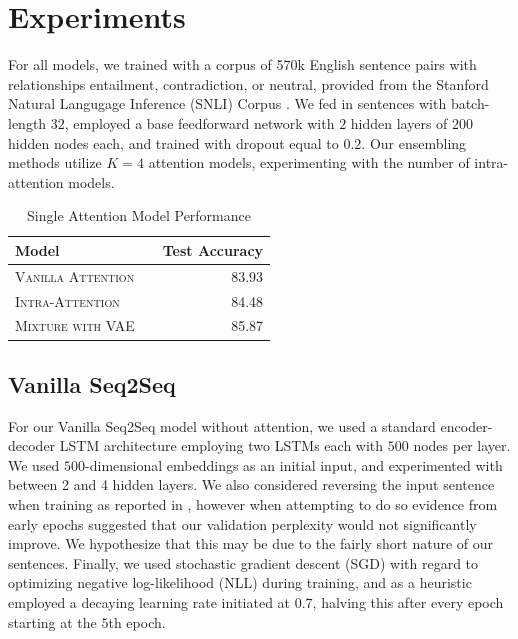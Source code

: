 \documentclass[11pt]{article}
\begin{document}

\section{Experiments}

For all models, we trained with a corpus of 570k English sentence pairs with relationships entailment, contradiction, or neutral, provided from the Stanford Natural Langugage Inference (SNLI) Corpus \citep{snli:emnlp2015}. We fed in sentences with batch-length $32$, employed a base feedforward network with $2$ hidden layers of $200$ hidden nodes each, and trained with dropout equal to $0.2$. Our ensembling methods utilize $K = 4$ attention models, experimenting with the number of intra-attention models.


\begin{table}[h]
\centering
\begin{tabular}{llr}
 \toprule
 Model &  & Test Accuracy \\
 \midrule
 \textsc{Vanilla Attention} & & 83.93\\
 \textsc{Intra-Attention} & & 84.48 \\
 \textsc{Mixture with VAE} & & 85.87 \\
 \bottomrule
\end{tabular}
\caption{\label{tab:results} Single Attention Model Performance}
\end{table}

\subsection{Vanilla Seq2Seq}
For our Vanilla Seq2Seq model without attention, we used a standard encoder-decoder LSTM architecture employing two LSTMs each with $500$ nodes per layer. We used $500$-dimensional embeddings as an initial input, and experimented with between 2 and 4 hidden layers. We also considered reversing the input sentence when training as reported in \cite{43155}, however when attempting to do so evidence from early epochs suggested that our validation perplexity would not significantly improve. We hypothesize that this may be due to the fairly short nature of our sentences. Finally, we used stochastic gradient descent (SGD) with regard to optimizing negative log-likelihood (NLL) during training, and as a heuristic employed a decaying learning rate initiated at $0.7$, halving this after every epoch starting at the $5$th epoch.
\end{document}
